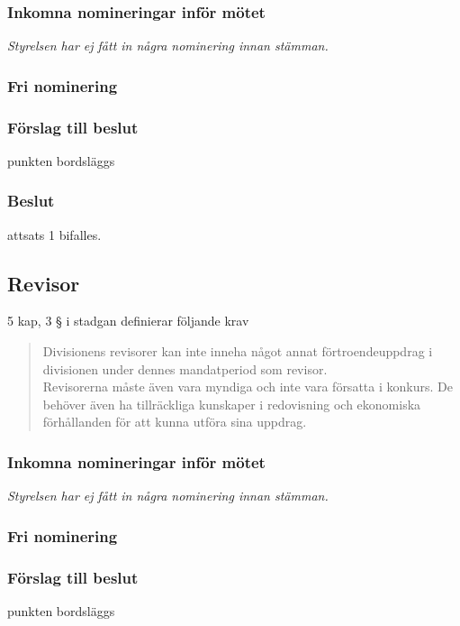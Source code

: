 \documentclass[protokoll]{dvd}
\begin{document}
\subsubsection*{Inkomna nomineringar inför mötet}
\textit{Styrelsen har ej fått in några nominering innan stämman.}
\subsubsection*{Fri nominering}
\subsubsection*{Förslag till beslut}
\begin{attsatser}
    \item punkten bordsläggs
\end{attsatser}
\subsubsection*{Beslut}
\begin{attsatser}
    \item attsats 1 bifalles.
\end{attsatser}

\subsection{Revisor}
5 kap, 3 § i stadgan definierar följande krav
\begin{quote}
    Divisionens revisorer kan inte inneha något annat förtroendeuppdrag i divisionen under dennes mandatperiod som revisor.\\
    
    Revisorerna måste även vara myndiga och inte vara försatta i konkurs. De behöver även ha tillräckliga kunskaper i redovisning och ekonomiska förhållanden för att kunna utföra sina uppdrag.
\end{quote}
\subsubsection*{Inkomna nomineringar inför mötet}
\textit{Styrelsen har ej fått in några nominering innan stämman.}
\subsubsection*{Fri nominering}
\subsubsection*{Förslag till beslut}
\begin{attsatser}
    \item punkten bordsläggs
\end{attsatser}
\end{document}

